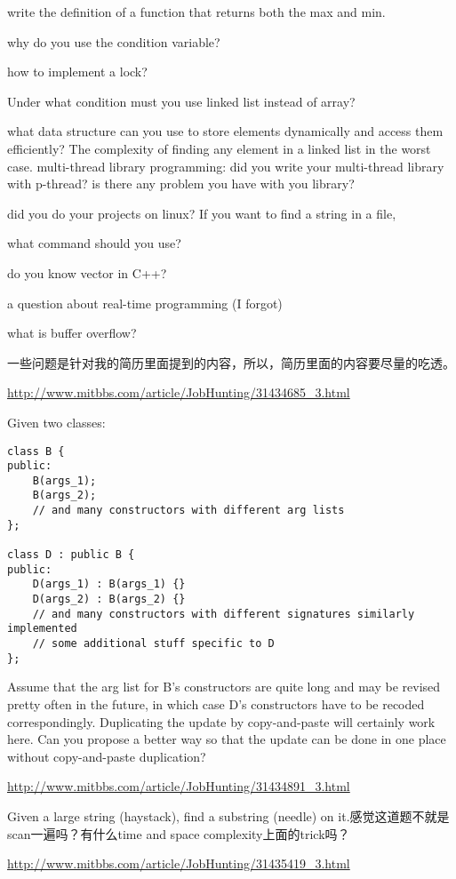 \documentclass[12pt]{book}
\begin{document}
write the definition of a function that returns both the max and min.

why do you use the condition variable?

how to implement a lock?

Under what condition must you use linked list instead of array?

what data structure can you use to store elements dynamically and
access them efficiently? The complexity of finding any element in a
linked list in the worst case. multi-thread library programming: did you write your multi-thread library 
with p-thread? is there any problem you have with you library?

did you do your projects on linux? If you want to find a string in a file, 

what command should you use?

do you know vector in C++?

a question about real-time programming (I forgot)

what is buffer overflow?

一些问题是针对我的简历里面提到的内容，所以，简历里面的内容要尽量的吃透。

\url{http://www.mitbbs.com/article/JobHunting/31434685_3.html}

Given two classes:
\lstset{language=java,label= ,caption= ,numbers=none}
\begin{lstlisting}
class B {
public:
    B(args_1);
    B(args_2);
    // and many constructors with different arg lists
};

class D : public B {
public:
    D(args_1) : B(args_1) {}
    D(args_2) : B(args_2) {}
    // and many constructors with different signatures similarly implemented
    // some additional stuff specific to D
};
\end{lstlisting}

Assume that the arg list for B's constructors are quite long and may be
revised pretty often in the future, in which case D's constructors have
to be recoded correspondingly. Duplicating the update by copy-and-paste
will certainly work here. Can you propose a better way so that the
update can be done in one place without copy-and-paste duplication?

\url{http://www.mitbbs.com/article/JobHunting/31434891_3.html}

Given a large string (haystack), find a substring (needle) on it.感觉这道题不就是scan一遍吗？有什么time and space complexity上面的trick吗？

\url{http://www.mitbbs.com/article/JobHunting/31435419_3.html}
\end{document}
